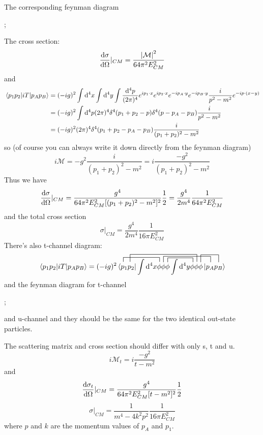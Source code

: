 \documentclass{article}
\newcommand{\s}{\sigma}
\begin{document}
\begin{enumerate}[(i)]
  The corresponding feynman diagram
  \begin{center}
    ;
  \end{center}
  The cross section:
  $$\dv{\s}{\Omega}|_{CM}=\frac{\abs{\mathcal{M}}^2}{64\pi^2E_{CM}^2}$$
  and
  \begin{align*}
    \mel{p_1p_2}{iT}{p_Ap_B}&=(-ig)^2\int\dd^4x\int\dd^4y\int\frac{\dd^4p}{(2\pi)^4}e^{ip_1\cdot x}e^{ip_2\cdot x}e^{-ip_A\cdot y}e^{-ip_B\cdot y}\frac{i}{p^2-m^2}e^{-ip\cdot(x-y)}\\
    &=(-ig)^2\int\dd^4p(2\pi)^4\delta^4(p_1+p_2-p)\delta^4(p-p_A-p_B)\frac{i}{p^2-m^2}\\
    &=(-ig)^2(2\pi)^4\delta^4(p_1+p_2-p_A-p_B)\frac{i}{(p_1+p_2)^2-m^2}
  \end{align*}
  so (of course you can always write it down directly from the feynman diagram)
  $$i\mathcal{M}=-g^2\frac{i}{(p_1+p_2)^2-m^2}=i\frac{-g^2}{(p_1+p_2)^2-m^2}$$
  Thus we have
  $$\dv{\s}{\Omega}|_{CM}=\frac{g^4}{64\pi^2E^2_{CM}[(p_1+p_2)^2-m^2]^2}\frac{1}{2}=\frac{g^4}{2m^4}\frac{1}{64\pi^2E_{CM}^2}$$
  and the total cross section
  $$\s|_{CM}=\frac{g^4}{2m^4}\frac{1}{16\pi E_{CM}^2}$$
  There's also t-channel diagram:
  $$\mel{p_1p_2}{iT}{p_Ap_B}=(-ig)^2\contraction[1.5ex]{}{\bra{p_1}}{p_2\int\dd^4x}{\phi}\contraction[2.5ex]{p_1}{\bra{p_2}}{\int\dd^4x\phi\phi\phi\int\dd^4y\phi}{\phi}\contraction[1.5ex]{\bra{p_1p_2}\int\dd^4x\phi\phi}{\phi}{\int\dd^4x}{\phi}\contraction[2ex]{\bra{p_1p_2}\int\dd^4x\phi}{\phi}{\phi\int\dd^4x\phi\phi\phi}{\bra{p_A}}\contraction[2.5ex]{\bra{p_1p_2}\int\dd^4x\phi\phi\phi\int\dd^4y\phi\phi}{\phi}{p_A}{\bra{p_B}} \bra{p_1p_2}\int\dd^4x\phi\phi\phi\int\dd^4y\phi\phi\phi\ket{p_Ap_B}
  $$
  and the feynman diagram for t-channel
  \begin{center}
    ;
  \end{center}
  and u-channel and they should be the same for the two identical out-state particles.

  The scattering matrix and cross section should differ with only s, t and u.
  $$i\mathcal{M}_t=i\frac{-g^2}{t-m^2}$$
  and
  $$\dv{\s_t}{\Omega}|_{CM}=\frac{g^4}{64\pi^2E^2_{CM}[t-m^2]^2}\frac{1}{2}$$
  $$\s|_{CM}=\frac{1}{m^4-4 k^2 p^2}\frac{1}{16\pi E_{CM}^2}$$
  where $p$ and $k$ are the momentum values of $p_A$ and $p_1$.
\end{enumerate}
\end{document}
